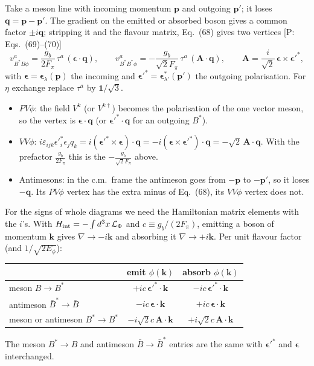 \documentclass[11pt,a4paper]{article}
\newcommand{\tagP}[1]{\textcolor{blue!65!black}{\textsf{\small[P:\,#1]}}}
\newenvironment{aiadd}{\par}{\par}
\begin{document}
\begin{aiadd}
	Take a meson line with incoming momentum $\bm p$ and outgoing $\bm p'$; it loses $\bm q=\bm p-\bm p'$. The gradient on the emitted or absorbed boson gives a common factor $\pm i\bm q$; stripping it and the flavour matrix, Eq.~(68) gives two vertices \tagP{Eqs.~(69)--(70)}
	\[
		v^a_{B^*B\phi}=\frac{g_b}{2F_\pi}\,\tau^a\,(\bm\epsilon\cdot\bm q),\qquad
		v^a_{B^*B^*\phi}=-\frac{g_b}{\sqrt2F_\pi}\,\tau^a\,(\bm A\cdot\bm q),\qquad
		\bm A=\frac{i}{\sqrt2}\,\bm\epsilon\times\bm\epsilon'^*,
	\]
	with $\bm\epsilon=\bm\epsilon_\lambda(\bm p)$ the incoming and $\bm\epsilon'^*=\bm\epsilon^*_{\lambda'}(\bm p')$ the outgoing polarisation. For $\eta$ exchange replace $\tau^a$ by $\bm 1/\sqrt3$.
	\begin{itemize}
		\item $PV\phi$: the field $V^k$ (or $V^{k\dagger}$) becomes the polarisation of the one vector meson, so the vertex is $\bm\epsilon\cdot\bm q$ (or $\bm\epsilon'^*\cdot\bm q$ for an outgoing $B^*$).
		\item $VV\phi$: $i\varepsilon_{ijk}\epsilon'^*_i\epsilon_jq_k=i(\bm\epsilon'^*\times\bm\epsilon)\cdot\bm q=-i(\bm\epsilon\times\bm\epsilon'^*)\cdot\bm q=-\sqrt2\,\bm A\cdot\bm q$. With the prefactor $\frac{g_b}{2F_\pi}$ this is the $-\frac{g_b}{\sqrt2F_\pi}$ above.
		\item Antimesons: in the c.m.\ frame the antimeson goes from $-\bm p$ to $-\bm p'$, so it loses $-\bm q$. Its $PV\phi$ vertex has the extra minus of Eq.~(68), its $VV\phi$ vertex does not.
	\end{itemize}
	For the signs of whole diagrams we need the Hamiltonian matrix elements with the $i$'s. With $H_{\rm int}=-\int d^3x\,\mathcal L_\Phi$ and $c\equiv g_b/(2F_\pi)$, emitting a boson of momentum $\bm k$ gives $\nabla\to-i\bm k$ and absorbing it $\nabla\to+i\bm k$. Per unit flavour factor (and $1/\sqrt{2E_\phi}$):
	\begin{center}
		\begin{tabular}{lcc}
			                                & emit $\phi(\bm k)$              & absorb $\phi(\bm k)$            \\ \hline
			meson $B\to B^*$                & $+ic\,\bm\epsilon'^*\cdot\bm k$ & $-ic\,\bm\epsilon'^*\cdot\bm k$ \\
			antimeson $\bar B^*\to\bar B$   & $-ic\,\bm\epsilon\cdot\bm k$    & $+ic\,\bm\epsilon\cdot\bm k$    \\
			meson or antimeson $B^*\to B^*$ & $-i\sqrt2c\,\bm A\cdot\bm k$    & $+i\sqrt2c\,\bm A\cdot\bm k$
		\end{tabular}
	\end{center}
	The meson $B^*\to B$ and antimeson $\bar B\to\bar B^*$ entries are the same with $\bm\epsilon'^*$ and $\bm\epsilon$ interchanged.
\end{aiadd}
\end{document}
